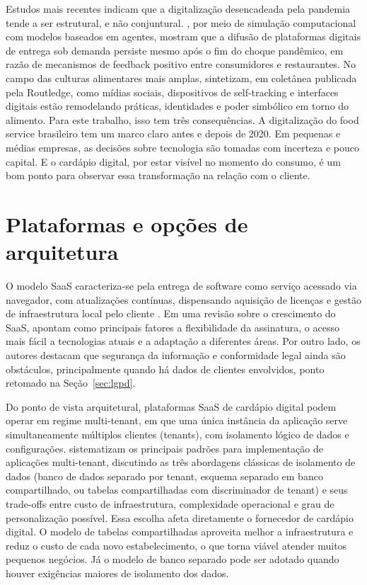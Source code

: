 Estudos mais recentes indicam que a digitalização desencadeada pela pandemia tende a ser estrutural, e não conjuntural. , por meio de simulação computacional com modelos baseados em agentes, mostram que a difusão de plataformas digitais de entrega sob demanda persiste mesmo após o fim do choque pandêmico, em razão de mecanismos de feedback positivo entre consumidores e restaurantes. No campo das culturas alimentares mais amplas,  sintetizam, em coletânea publicada pela Routledge, como mídias sociais, dispositivos de self-tracking e interfaces digitais estão remodelando práticas, identidades e poder simbólico em torno do alimento. Para este trabalho, isso tem três consequências. A digitalização do food service brasileiro tem um marco claro antes e depois de 2020. Em pequenas e médias empresas, as decisões sobre tecnologia são tomadas com incerteza e pouco capital. E o cardápio digital, por estar visível no momento do consumo, é um bom ponto para observar essa transformação na relação com o cliente.

\section{Plataformas e opções de arquitetura}

O modelo SaaS caracteriza-se pela entrega de software como serviço acessado via navegador, com atualizações contínuas, dispensando aquisição de licenças e gestão de infraestrutura local pelo cliente \cite{correia2024crescimentosaas}. Em uma revisão sobre o crescimento do SaaS,  apontam como principais fatores a flexibilidade da assinatura, o acesso mais fácil a tecnologias atuais e a adaptação a diferentes áreas. Por outro lado, os autores destacam que segurança da informação e conformidade legal ainda são obstáculos, principalmente quando há dados de clientes envolvidos, ponto retomado na Seção~\ref{sec:lgpd}.

Do ponto de vista arquitetural, plataformas SaaS de cardápio digital podem operar em regime multi-tenant, em que uma única instância da aplicação serve simultaneamente múltiplos clientes (tenants), com isolamento lógico de dados e configurações.  sistematizam os principais padrões para implementação de aplicações multi-tenant, discutindo as três abordagens clássicas de isolamento de dados (banco de dados separado por tenant, esquema separado em banco compartilhado, ou tabelas compartilhadas com discriminador de tenant) e seus trade-offs entre custo de infraestrutura, complexidade operacional e grau de personalização possível. Essa escolha afeta diretamente o fornecedor de cardápio digital. O modelo de tabelas compartilhadas aproveita melhor a infraestrutura e reduz o custo de cada novo estabelecimento, o que torna viável atender muitos pequenos negócios. Já o modelo de banco separado pode ser adotado quando houver exigências maiores de isolamento dos dados.

